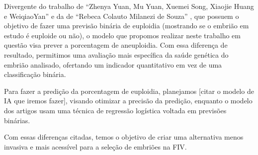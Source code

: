 Divergente do trabalho de “Zhenya Yuan, Mu Yuan, Xuemei Song, Xiaojie Huang e WeiqiaoYan” \cite{yuan2023} e da de “Rebeca Colauto Milanezi de Souza” \cite{souzarebeca2022}, que possuem o objetivo de fazer uma previsão binária de euploidia (mostrando se o embrião em estudo é euploide ou não), o modelo que propomos realizar neste trabalho em questão visa prever a porcentagem de aneuploidia. Com essa diferença de resultado, permitimos uma avaliação mais específica da saúde genética do embrião analisado, ofertando um indicador quantitativo em vez de uma classificação binária.

Para fazer a predição da porcentagem de euploidia, planejamos [citar o modelo de IA que iremos fazer], visando otimizar a precisão da predição, enquanto o modelo dos artigos usam uma técnica de regressão logística voltada em previsões binárias.

Com essas diferenças citadas, temos o objetivo de criar uma alternativa menos invasiva e mais acessível para a seleção de embriões na FIV.
